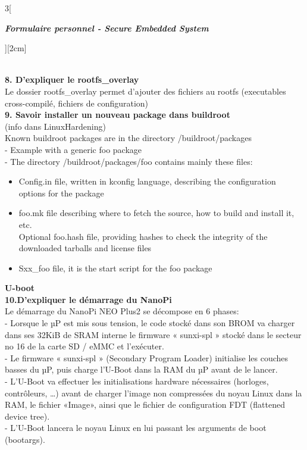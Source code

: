\begin{multicols}{3}[\centerline{ \large\em \textbf{Formulaire personnel - Secure Embedded System}}][2cm]
\begin{minipage}{\linewidth}
\end{minipage}
\\ \textbf{8. D’expliquer le rootfs\_overlay\\}
Le dossier rootfs\_overlay permet d’ajouter des fichiers
au rootfs (executables cross-compilé, fichiers de configuration)
\\ \textbf{9. Savoir installer un nouveau package dans buildroot\\}
(info dans LinuxHardening)\\
Known buildroot packages are in the directory /buildroot/packages\\
- Example with a generic foo package\\
- The directory /buildroot/packages/foo contains mainly these files:
\begin{itemize}
\item Config.in file, written in kconfig language, describing the configuration options for the package
\item foo.mk file describing where to fetch the source, how to build and install it, etc. \\
Optional foo.hash file, providing hashes to check the integrity of the
downloaded tarballs and license files
\item Sxx\_foo file, it is the start script for the foo package
\end{itemize}
\newpage
{\Large \textbf{U-boot}}
\\ \textbf{10.D'expliquer le démarrage du NanoPi\\}
Le démarrage du NanoPi NEO Plus2 se décompose en 6 phases:\\
- Lorsque le µP est mis sous tension, le code stocké dans son BROM va charger
dans ses 32KiB de SRAM interne le firmware « sunxi-spl » stocké dans le
secteur no 16 de la carte SD / eMMC et l’exécuter.\\
- Le firmware « sunxi-spl » (Secondary Program Loader) initialise les couches
basses du µP, puis charge l’U-Boot dans la RAM du µP avant de le lancer.\\
- L’U-Boot va effectuer les initialisations hardware nécessaires (horloges,
contrôleurs, …) avant de charger l’image non compressées du noyau Linux dans
la RAM, le fichier «Image», ainsi que le fichier de configuration FDT (flattened device tree).\\
- L’U-Boot lancera le noyau Linux en lui passant les arguments de boot (bootargs).\\

\end{multicols}
